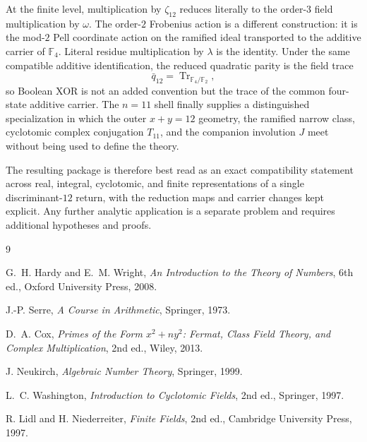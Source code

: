 \documentclass[11pt]{article}
\theoremstyle{remark}
\newcommand{\F}{\mathbb F}
\newcommand{\Tr}{\operatorname{Tr}}
\begin{document}
At the finite level, multiplication by $\zeta_{12}$ reduces literally to the
order-$3$ field multiplication by $\omega$.  The order-$2$ Frobenius action is
a different construction: it is the mod-$2$ Pell coordinate action on the
ramified ideal transported to the additive carrier of $\F_4$.  Literal residue
multiplication by $\lambda$ is the identity.  Under the same compatible
additive identification, the reduced quadratic parity is the field trace
\[
\bar q_{12}=\Tr_{\F_4/\F_2},
\]
so Boolean XOR is not an added convention but the trace of the common
four-state additive carrier.  The $n=11$ shell finally supplies a distinguished
specialization in which the outer $x+y=12$ geometry, the ramified narrow class,
cyclotomic complex conjugation $T_{11}$, and the companion involution $J$ meet
without being used to define the theory.

The resulting package is therefore best read as an exact compatibility
statement across real, integral, cyclotomic, and finite representations of a
single discriminant-$12$ return, with the reduction maps and carrier changes
kept explicit.  Any further analytic application is a separate problem and
requires additional hypotheses and proofs.

\begin{thebibliography}{9}

G.~H. Hardy and E.~M. Wright,
\emph{An Introduction to the Theory of Numbers},
6th ed., Oxford University Press, 2008.

J.-P. Serre,
\emph{A Course in Arithmetic},
Springer, 1973.

D.~A. Cox,
\emph{Primes of the Form $x^2+ny^2$: Fermat, Class Field Theory, and Complex Multiplication},
2nd ed., Wiley, 2013.

J. Neukirch,
\emph{Algebraic Number Theory},
Springer, 1999.

L.~C. Washington,
\emph{Introduction to Cyclotomic Fields},
2nd ed., Springer, 1997.

R. Lidl and H. Niederreiter,
\emph{Finite Fields},
2nd ed., Cambridge University Press, 1997.

\end{thebibliography}
\end{document}
